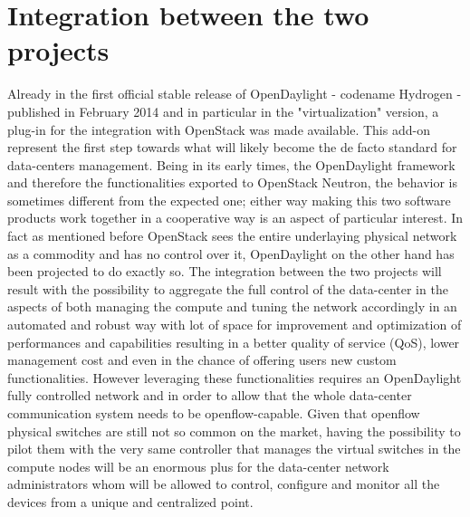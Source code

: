 \section{Integration between the two projects}
Already in the first official stable release of OpenDaylight - codename Hydrogen - published in February 2014 and in particular in the "virtualization" version, a plug-in for the integration with OpenStack was made available. This add-on represent the first step towards what will likely become the de facto standard for data-centers management. Being in its early times, the OpenDaylight framework and therefore the functionalities exported to OpenStack Neutron, the behavior is sometimes different from the expected one; either way making this two software products work together in a cooperative way is an aspect of particular interest. In fact as mentioned before OpenStack sees the entire underlaying physical network as a commodity and has no control over it, OpenDaylight on the other hand has been projected to do exactly so.
The integration between the two projects will result with the possibility to aggregate the full control of the data-center in the aspects of both managing the compute and tuning the network accordingly in an automated and robust way with lot of space for improvement and optimization of performances and capabilities resulting in a better quality of service (QoS), lower management cost and even in the chance of offering users new custom functionalities.
However leveraging these functionalities requires an OpenDaylight fully controlled network and in order to allow that the whole data-center communication system needs to be openflow-capable.
Given that openflow physical switches are still not so common on the market, having the possibility to pilot them with the very same controller that manages the virtual switches in the compute nodes will be an enormous plus for the data-center network administrators whom will be allowed to control, configure and monitor all the devices from a unique and centralized point.


%
%
%
%
%
